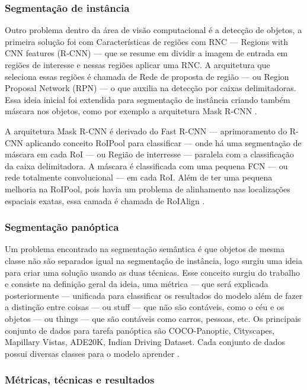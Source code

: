 \subsubsection*{Segmentação de instância}

Outro problema dentro da área de visão computacional é a detecção de objetos, a primeira solução foi com Características de regiões com RNC — Regions with CNN features (R-CNN) — que se resume em dividir a imagem de entrada em regiões de interesse e nessas regiões aplicar uma RNC. A arquitetura que seleciona essas regiões é chamada de Rede de proposta de região — ou Region Proposal Network (RPN) — o que auxilia na detecção por caixas delimitadoras. Essa ideia inicial foi extendida para segmentação de instância criando também máscara nos objetos, como por exemplo a arquitetura Mask R-CNN \cite{dp_semantic_segmantation, lapix}.

A arquitetura Mask R-CNN é derivado do Fast R-CNN — aprimoramento do R-CNN aplicando conceito RoIPool para classificar — onde há uma segmentação de máscara em cada RoI — ou Região de interresse — paralela com a classificação da caixa delimitadora. A máscara é classificada com uma pequena FCN — ou rede totalmente convolucional — em cada RoI. Além de ter uma pequena melhoria na RoIPool, pois havia um problema de alinhamento nas localizações espaciais exatas, essa camada é chamada de RoIAlign \cite{maskRCNN}.

\subsubsection*{Segmentação panóptica}

Um problema encontrado na segmentação semântica é que objetos de mesma classe não são separados igual na segmentação de instância, logo surgiu uma ideia para criar uma solução usando as duas técnicas. Esse conceito surgiu do trabalho  e consiste na definição geral da ideia, uma métrica — que será explicada posteriormente — unificada para classificar os resultados do modelo além de fazer a distinção entre coisas — ou stuff — que não são contáveis, como o céu e os objetos — ou things — que são contáveis como carros, pessoas, etc. 
Os principais conjunto de dados para tarefa panóptica são COCO-Panoptic, Cityscapes, Mapillary Vistas, ADE20K, Indian Driving Dataset. Cada conjunto de dados possui diversas classes para o modelo aprender \cite{v7labs2022panoptic}.

\subsubsection*{Métricas, técnicas e resultados}

